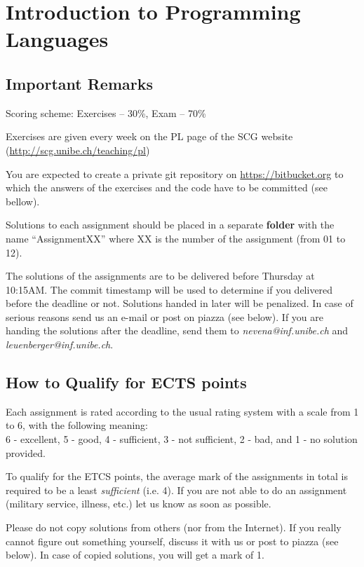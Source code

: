 \documentclass [11pt, a4wide, twoside]{article}
\begin{document}
\section*{\space{} Introduction to Programming Languages}


\subsection*{Important Remarks}
\begin{myitemize}
\item Scoring scheme: Exercises -- 30\%, Exam -- 70\%
\item Exercises are given every week on the PL page of the SCG website \\ (\url{http://scg.unibe.ch/teaching/pl})
\item You are expected to create a private git repository on
\url{https://bitbucket.org} to which the answers of the exercises and the code
have to be committed (see bellow). 
\item Solutions to each assignment should be placed in a separate \textbf{folder} with the name ``AssignmentXX'' where XX is the number of the assignment (from 01 to 12).
\item The solutions of the assignments are to be delivered before Thursday at 10:15AM. The commit timestamp will be used to determine if you delivered before the deadline or not. Solutions handed in later will be penalized. In case of serious reasons send us an e-mail or post on piazza (see below). If you are handing the solutions after the deadline, send them to \emph{nevena@inf.unibe.ch} and \emph{leuenberger@inf.unibe.ch}.
\end{myitemize}

\subsection*{How to Qualify for ECTS points}
\begin{myitemize}
\item Each assignment is rated according to the usual rating system with a scale from 1 to 6, with the following meaning: \\
6 - excellent, 5 - good, 4 - sufficient, 3 - not sufficient, 2 - bad, and 1 - no solution provided.
\item To qualify for the ETCS points, the average mark of the assignments in total is required to be a least \emph{sufficient} (i.e. 4). If you are not able to do an assignment (military service, illness, etc.) let us know as soon as possible.
\item Please do not copy solutions from others (nor from the Internet). If you really cannot figure out something yourself, discuss it with us or post to piazza (see below). In case of copied solutions, you will get a mark of 1.
\end{myitemize}
\end{document}
